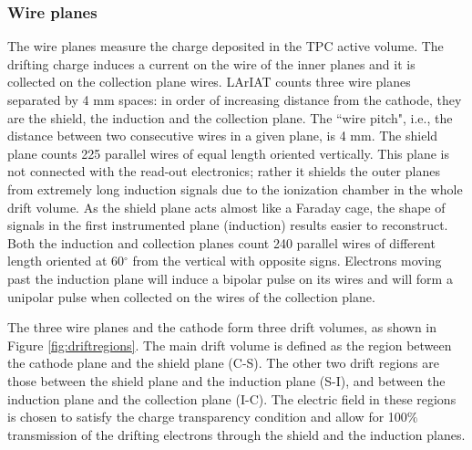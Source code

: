\subsubsection{Wire planes}
The wire planes measure the charge deposited in the TPC active volume. The drifting charge induces a current on the wire of the inner planes and it is collected on the collection plane wires.
LArIAT counts three wire planes separated by 4 mm spaces: in order of increasing distance from the cathode, they are the shield, the induction and the collection plane. The ``wire pitch", i.e., the distance between two consecutive wires in a given plane, is 4 mm.  The shield plane counts 225 parallel wires of equal length oriented vertically. This plane is not connected with the read-out electronics; rather it shields the outer planes from extremely long induction signals due to the ionization chamber in the whole drift volume. As the shield plane acts almost like a Faraday cage, the shape of signals in the first instrumented plane (induction)  results easier to reconstruct.  Both the induction and collection planes count 240 parallel wires of different length oriented at 60$^\circ$ from the vertical with opposite signs.
Electrons moving past the induction plane will induce a bipolar pulse on its wires and will form a unipolar pulse when collected on the wires of the collection plane. 

The three wire planes and the cathode form three drift volumes, as shown in Figure \ref{fig:driftregions}. 
The main drift volume is defined as the region between the cathode plane and the shield plane (C-S). The other two drift regions are those between the shield plane and the induction plane (S-I), and between the induction plane and the collection plane (I-C). The electric field in these regions is chosen to satisfy the charge transparency condition and allow for 100$\%$ transmission of the drifting electrons through the shield and the induction planes. 

